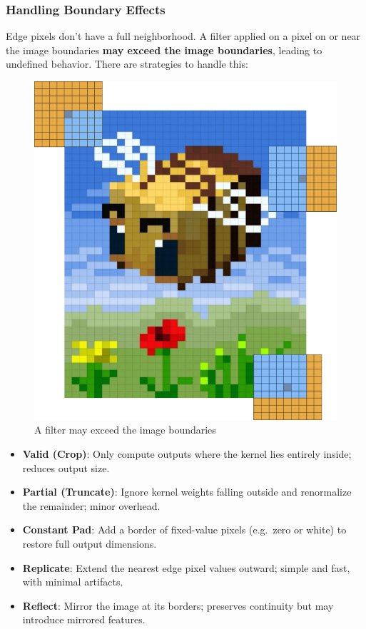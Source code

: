 \subsubsection*{Handling Boundary Effects}

Edge pixels don't have a full neighborhood. A filter applied on a
pixel on or near the image boundaries \textbf{may exceed the image
boundaries}, leading to undefined behavior. There are strategies to
handle this:

\begin{minipage}{\linewidth}
  \begin{figure}[H]
    \centering
    \includegraphics[width=0.6\linewidth]{images/edges.png}
    \caption{A filter may exceed the image boundaries}
  \end{figure}
\end{minipage}

\begin{itemize}
  \item \textbf{Valid (Crop)}: Only compute outputs where the kernel
    lies entirely inside; reduces output size.
  \item \textbf{Partial (Truncate)}: Ignore kernel weights falling
    outside and renormalize the remainder; minor overhead.
  \item \textbf{Constant Pad}: Add a border of fixed-value pixels
    (e.g.\ zero or white) to restore full output dimensions.
  \item \textbf{Replicate}: Extend the nearest edge pixel values
    outward; simple and fast, with minimal artifacts.
  \item \textbf{Reflect}: Mirror the image at its borders; preserves
    continuity but may introduce mirrored features.
\end{itemize}

